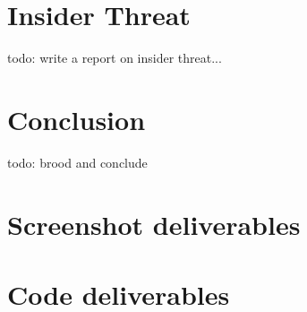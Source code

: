 \documentclass[12pt]{report}
\begin{document}
\pagebreak
\chapter{Insider Threat}
todo: write a report on insider threat...


\pagebreak
\chapter{Conclusion}
todo: brood and conclude




\pagebreak
\nocite{example:referenceid:here}

\begin{flushleft}
  
\end{flushleft}


\appendix

\pagebreak
\chapter{Screenshot deliverables}

\pagebreak
\chapter{Code deliverables}
\end{document}
